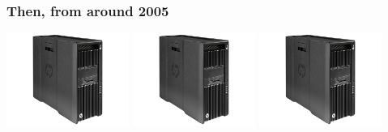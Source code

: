\documentclass{beamer}
\begin{document}
\begin{frame}
  \frametitle{Then, from around 2005}
  \begin{center}
    \includegraphics[width=0.3\textwidth]{img/hp.jpg}
    \includegraphics[width=0.3\textwidth]{img/hp.jpg}
    \includegraphics[width=0.3\textwidth]{img/hp.jpg}
  \end{center}

\end{frame}
\end{document}
